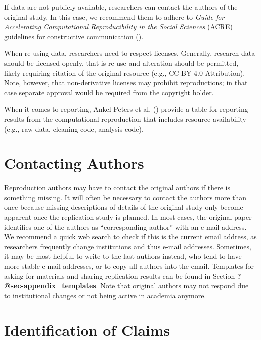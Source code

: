 \documentclass[
  letterpaper,
  DIV=11,
  openany,
  fontsize=12pt,
  parskip=half,
  headings=big,
  numbers=noenddot,
  titlepage=false]{scrreprt}
\begin{document}
If data are not publicly available, researchers can contact the authors
of the original study. In this case, we recommend them to adhere to
\emph{Guide for Accelerating Computational Reproducibility in the Social
Sciences} (ACRE) guidelines for constructive communication
().

When re-using data, researchers need to respect licenses. Generally,
research data should be licensed openly, that is re-use and alteration
should be permitted, likely requiring citation of the original resource
(e.g., CC-BY 4.0 Attribution). Note, however, that non-derivative
licenses may prohibit reproductions; in that case separate approval
would be required from the copyright holder.

When it comes to reporting, Ankel-Peters et al.
() provide a table for reporting
results from the computational reproduction that includes resource
availability (e.g., raw data, cleaning code, analysis code).

\section{Contacting Authors}\label{contacting-authors}

Reproduction authors may have to contact the original authors if there
is something missing. It will often be necessary to contact the authors
more than once because missing descriptions of details of the original
study only become apparent once the replication study is planned. In
most cases, the original paper identifies one of the authors as
``corresponding author'' with an e-mail address. We recommend a quick
web search to check if this is the current email address, as researchers
frequently change institutions and thus e-mail addresses. Sometimes, it
may be most helpful to write to the last authors instead, who tend to
have more stable e-mail addresses, or to copy all authors into the
email. Templates for asking for materials and sharing replication
results can be found in Section \textbf{?@sec-appendix\_templates}. Note
that original authors may not respond due to institutional changes or
not being active in academia anymore.

\section{Identification of Claims}\label{identification-of-claims}
\end{document}
